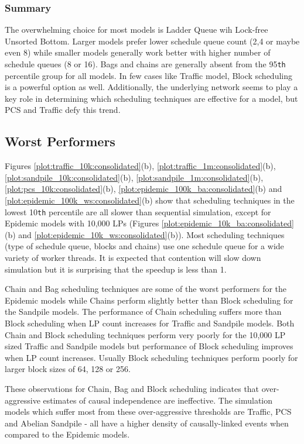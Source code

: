\documentclass[11pt]{book}
\begin{document}
\subsubsection{Summary}
\label{subsubsec:summary_top}
The overwhelming choice for most models is Ladder Queue wih Lock-free Unsorted Bottom. Larger models
prefer lower schedule queue count (2,4 or maybe even 8) while smaller models generally work better
with higher number of schedule queues (8 or 16). Bags and chains are generally absent from the
95\texttt{th} percentile group for all models. In few cases like Traffic model, Block scheduling is a
powerful option as well. Additionally, the underlying network seems to play a key role in determining
which scheduling techniques are effective for a model, but PCS and Traffic defy this trend.


\subsection{Worst Performers}
\label{subsec:worst_performers}
Figures \ref{plot:traffic_10k:consolidated}(b), \ref{plot:traffic_1m:consolidated}(b),
\ref{plot:sandpile_10k:consolidated}(b), \ref{plot:sandpile_1m:consolidated}(b),
\ref{plot:pcs_10k:consolidated}(b), \ref{plot:epidemic_100k_ba:consolidated}(b) and
\ref{plot:epidemic_100k_ws:consolidated}(b) show that scheduling techniques in the lowest 10\texttt{th}
percentile are all slower than sequential simulation, except for Epidemic models with 10,000 LPs (Figures
\ref{plot:epidemic_10k_ba:consolidated}(b) and \ref{plot:epidemic_10k_ws:consolidated}(b)). Most
scheduling techniques (type of schedule queue, blocks and chains) use one schedule queue for a wide
variety of worker threads. It is expected that contention will slow down simulation but it is surprising
that the speedup is less than 1.

Chain and Bag scheduling techniques are some of the worst performers for the Epidemic models while
Chains perform slightly better than Block scheduling for the Sandpile models. The performance of Chain
scheduling suffers more than Block scheduling when LP count increases for Traffic and Sandpile models.
Both Chain and Block scheduling techniques perform very poorly for the 10,000 LP sized Traffic and
Sandpile models but performance of Block scheduling improves when LP count increases. Usually Block
scheduling techniques perform poorly for larger block sizes of 64, 128 or 256.

These observations for Chain, Bag and Block scheduling indicates that over-aggressive estimates of
causal independence are ineffective. The simulation models which suffer most from these over-aggressive
thresholds are Traffic, PCS and Abelian Sandpile - all have a higher density of causally-linked events
when compared to the Epidemic models.
\end{document}
